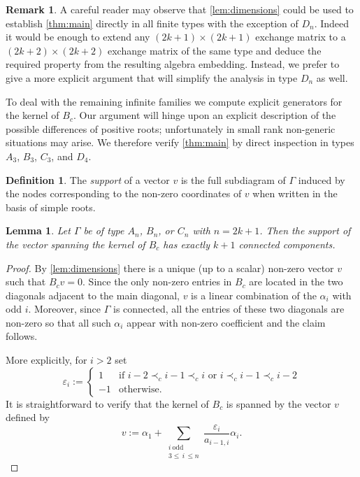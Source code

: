 \documentclass[11pt]{amsart}
\newtheorem{lemma}[theorem]{Lemma}
\theoremstyle{definition}
\newtheorem{remark}[theorem]{Remark}
\newtheorem{definition}[theorem]{Definition}
\numberwithin{equation}{section}
\numberwithin{figure}{section}
\begin{document}
  \begin{remark}
    \label{rk:induction}
    A careful reader may observe that \cref{lem:dimensions} could be used to establish \cref{thm:main} directly in all finite types with the exception of $D_n$. 
    Indeed it would be enough to extend any $(2k+1) \times (2k+1)$ exchange matrix to a $(2k+2) \times (2k+2)$ exchange matrix of the same type and deduce the required property from the resulting algebra embedding.
    Instead, we prefer to give a more explicit argument that will simplify the analysis in type $D_n$ as well.
  \end{remark}

  To deal with the remaining infinite families we compute explicit generators for the kernel of $B_c$. 
  Our argument will hinge upon an explicit description of the possible differences of positive roots; unfortunately in small rank non-generic situations may arise.
  We therefore verify \cref{thm:main} by direct inspection in types $A_3$, $B_3$, $C_3$, and $D_4$.

  \begin{definition}
    The \emph{support} of a vector $v$ is the full subdiagram of $\Gamma$ induced by the nodes corresponding to the non-zero coordinates of $v$ when written in the basis of simple roots.
  \end{definition}

  \begin{lemma}
    Let $\Gamma$ be of type $A_n$, $B_n$, or $C_n$ with $n=2k+1$.
    Then the support of the vector spanning the kernel of $B_c$ has exactly $k+1$ connected components. 
  \end{lemma} 
  \begin{proof}
    By \cref{lem:dimensions} there is a unique (up to a scalar) non-zero vector $v$ such that $B_cv=0$.
    Since the only non-zero entries in $B_c$ are located in the two diagonals adjacent to the main diagonal, $v$ is a linear combination of the $\alpha_i$ with odd $i$.
    Moreover, since $\Gamma$ is connected, all the entries of these two diagonals are non-zero so that all such $\alpha_i$ appear with non-zero coefficient and the claim follows.
    
    More explicitly, for $i>2$ set 
    \[
      \varepsilon_i :=
      \begin{cases}
        1 & \text{if $i-2\prec_c i-1 \prec_c i$ or $i\prec_c i-1 \prec_c i-2$}\\
        -1 & \text{otherwise.}
      \end{cases}
    \]
    It is straightforward to verify that the kernel of $B_c$ is spanned by the vector $v$ defined by
    \begin{equation}
      \label{eq:vector}
      v := 
      \alpha_1 + \sum_{\substack{i\ \mathrm{odd}\\ 3\le\, i\,\leq n}} \frac{\varepsilon_i}{a_{i-1,i}} \alpha_i.
    \end{equation}
  \end{proof}
  
\end{document}
